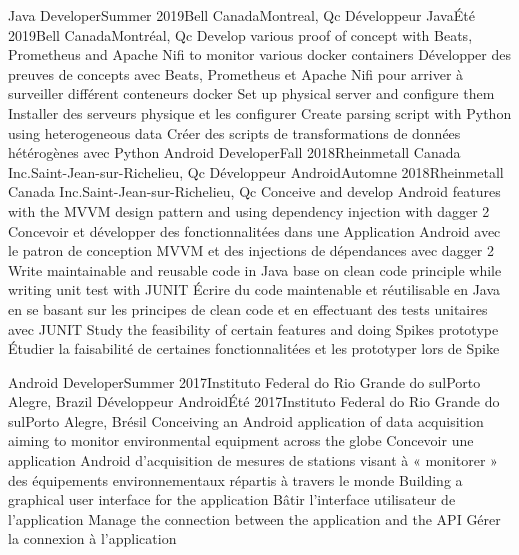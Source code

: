     \resumeSubheadingEnFr
      {Java Developer}{Summer 2019}{Bell Canada}{Montreal, Qc}
      {Développeur Java}{Été 2019}{Bell Canada}{Montréal, Qc}
            \resumeItemListStart
                \resumeItemEnFr
                    {Develop various proof of concept with Beats, Prometheus and Apache Nifi to monitor various docker containers}
                    {Développer des preuves de concepts avec Beats, Prometheus et Apache Nifi pour arriver à surveiller différent conteneurs docker}
                \resumeItemEnFr
                    {Set up physical server and configure them}
                    {Installer des serveurs physique et les configurer}
                \resumeItemEnFr
                    {Create parsing script with Python using heterogeneous data}
                    {Créer des scripts de transformations de données hétérogènes avec Python}
            \resumeItemListEnd
    \resumeSubheadingEnFr
      {Android Developer}{Fall 2018}{Rheinmetall Canada Inc.}{Saint-Jean-sur-Richelieu, Qc}
      {Développeur Android}{Automne 2018}{Rheinmetall Canada Inc.}{Saint-Jean-sur-Richelieu, Qc}
            \resumeItemListStart
                \resumeItemEnFr
                    {Conceive and develop Android features with the MVVM design pattern and using dependency injection with dagger 2}
                    {Concevoir et développer des fonctionnalitées dans une Application Android avec le patron de conception MVVM et des injections de dépendances avec dagger 2}
                \resumeItemEnFr
                    {Write maintainable and reusable code in Java base on clean code principle while writing unit test with JUNIT}
                    {Écrire du code maintenable et réutilisable en Java en se basant sur les principes de clean code et en effectuant des tests unitaires avec JUNIT}
                \resumeItemEnFr
                    {Study the feasibility of certain features and doing Spikes prototype}
                    {Étudier la faisabilité de certaines fonctionnalitées et les prototyper lors de Spike}
            \resumeItemListEnd

    \resumeSubheadingEnFr
      {Android Developer}{Summer 2017}{Instituto Federal do Rio Grande do sul}{Porto Alegre, Brazil}
      {Développeur Android}{Été 2017}{Instituto Federal do Rio Grande do sul}{Porto Alegre, Brésil}
            \resumeItemListStart
                \resumeItemEnFr
                    {Conceiving an Android application of data acquisition aiming to monitor environmental equipment across the globe}
                    {Concevoir une application Android d’acquisition de mesures de stations visant à   « monitorer » des équipements environnementaux répartis à travers le monde}
                \resumeItemEnFr
                    {Building a graphical user interface for the application}
                    {Bâtir l’interface utilisateur de l’application}
                \resumeItemEnFr
                    {Manage the connection between the application and the API}
                    {Gérer la connexion à l’application}
            \resumeItemListEnd
    \resumeSubHeadingListEnd


